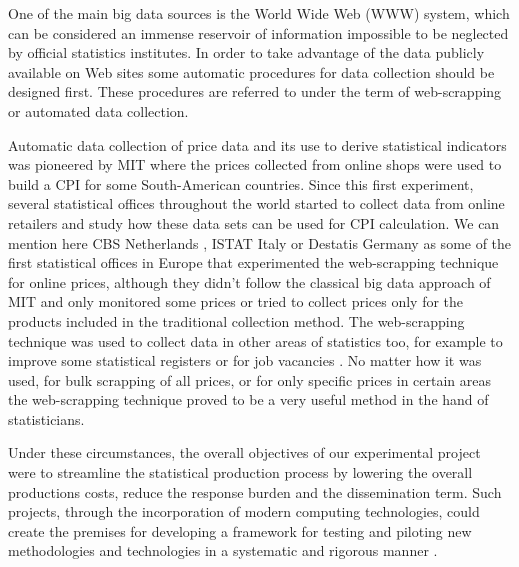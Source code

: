 \documentclass[]{article}
\begin{document}
One of the main big data sources is the World Wide Web (WWW) system, which can be considered an immense reservoir of information impossible to be neglected
by official statistics institutes. In order to take advantage of the data publicly available on Web sites some automatic procedures for data collection 
should be designed first. These procedures are referred to under the term of web-scrapping or automated data collection.

Automatic data collection of price data and its use to derive statistical indicators was pioneered by MIT \cite{MIT} where the prices collected 
from online shops were used to build a CPI for some South-American countries. Since this first experiment, several
statistical offices throughout the world started to collect data from online retailers and study how these data sets can be used
for CPI calculation. We can mention here CBS Netherlands \cite{cbs}, ISTAT Italy\cite{polidoro}  
or Destatis Germany \cite{bruner} as some of the first statistical offices in Europe that experimented the web-scrapping technique for online prices, 
although they didn't follow the classical big data approach of MIT and only monitored some prices or tried to collect prices
only for the products included in the traditional collection method. The web-scrapping technique was used to collect data in other areas
of statistics too, for example to improve some statistical registers \cite{barcoli} or for job vacancies \cite{swier2}.
No matter how it was used, for bulk scrapping of all prices, or for only specific prices in certain areas \cite{cbs2} the web-scrapping technique proved to be a very useful method in the hand of statisticians.


Under these circumstances, the overall objectives of our experimental project were to streamline the statistical production process by 
lowering the overall productions costs, reduce the response burden and the dissemination term. Such projects, through the incorporation 
of modern computing technologies, could create the premises for developing a framework for testing and piloting new methodologies 
and technologies in a systematic and rigorous manner \cite{ons2017}. 
\end{document}
